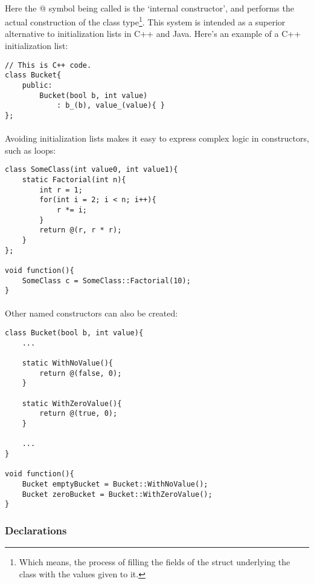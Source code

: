 \documentclass[12pt,twoside,notitlepage]{report}
\begin{document}
\paragraph{}
Here the @ symbol being called is the `internal constructor', and performs the actual construction of the class type\footnote{Which means, the process of filling the fields of the struct underlying the class with the values given to it.}. This system is intended as a superior alternative to initialization lists in C++ and Java. Here's an example of a C++ initialization list:


\begin{lstlisting}
// This is C++ code.
class Bucket{
	public:
		Bucket(bool b, int value)
			: b_(b), value_(value){ }
};
\end{lstlisting}


\paragraph{}
Avoiding initialization lists makes it easy to express complex logic in constructors, such as loops:


\begin{lstlisting}
class SomeClass(int value0, int value1){
	static Factorial(int n){
		int r = 1;
		for(int i = 2; i < n; i++){
			r *= i;
		}
		return @(r, r * r);
	}
};

void function(){
	SomeClass c = SomeClass::Factorial(10);
}
\end{lstlisting}


\paragraph{}
Other named constructors can also be created:


\begin{lstlisting}
class Bucket(bool b, int value){
	...
	
	static WithNoValue(){
		return @(false, 0);
	}
	
	static WithZeroValue(){
		return @(true, 0);
	}

	...
}

void function(){
	Bucket emptyBucket = Bucket::WithNoValue();
	Bucket zeroBucket = Bucket::WithZeroValue();
}
\end{lstlisting}


\subsubsection{Declarations}
\end{document}
